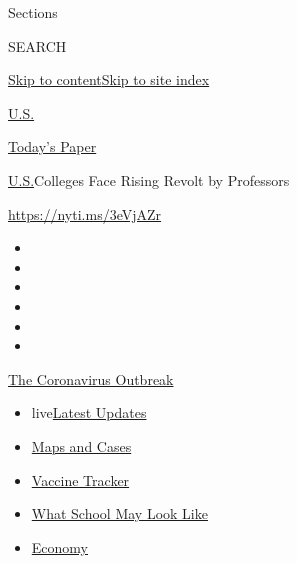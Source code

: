 Sections

SEARCH

\protect\hyperlink{site-content}{Skip to
content}\protect\hyperlink{site-index}{Skip to site index}

\href{https://www.nytimes.com/section/us}{U.S.}

\href{https://myaccount.nytimes.com/auth/login?response_type=cookie\&client_id=vi}{}

\href{https://www.nytimes.com/section/todayspaper}{Today's Paper}

\href{/section/us}{U.S.}\textbar{}Colleges Face Rising Revolt by
Professors

\url{https://nyti.ms/3eVjAZr}

\begin{itemize}
\item
\item
\item
\item
\item
\item
\end{itemize}

\href{https://www.nytimes.com/news-event/coronavirus?action=click\&pgtype=Article\&state=default\&region=TOP_BANNER\&context=storylines_menu}{The
Coronavirus Outbreak}

\begin{itemize}
\tightlist
\item
  live\href{https://www.nytimes.com/2020/08/02/world/coronavirus-updates.html?action=click\&pgtype=Article\&state=default\&region=TOP_BANNER\&context=storylines_menu}{Latest
  Updates}
\item
  \href{https://www.nytimes.com/interactive/2020/us/coronavirus-us-cases.html?action=click\&pgtype=Article\&state=default\&region=TOP_BANNER\&context=storylines_menu}{Maps
  and Cases}
\item
  \href{https://www.nytimes.com/interactive/2020/science/coronavirus-vaccine-tracker.html?action=click\&pgtype=Article\&state=default\&region=TOP_BANNER\&context=storylines_menu}{Vaccine
  Tracker}
\item
  \href{https://www.nytimes.com/interactive/2020/07/29/us/schools-reopening-coronavirus.html?action=click\&pgtype=Article\&state=default\&region=TOP_BANNER\&context=storylines_menu}{What
  School May Look Like}
\item
  \href{https://www.nytimes.com/live/2020/07/31/business/stock-market-today-coronavirus?action=click\&pgtype=Article\&state=default\&region=TOP_BANNER\&context=storylines_menu}{Economy}
\end{itemize}

